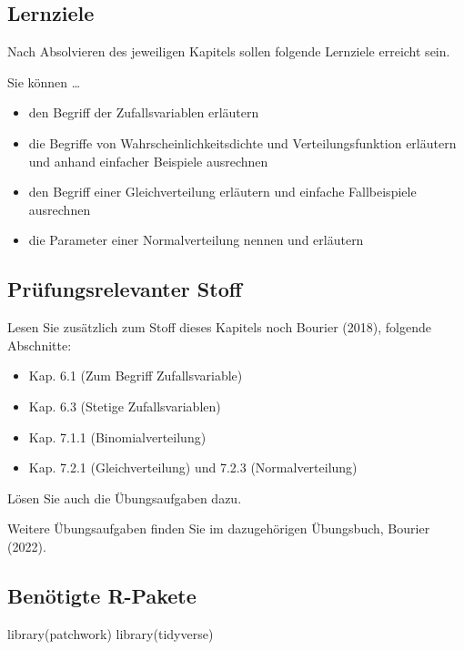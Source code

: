 \documentclass[
  a4paper,
  DIV=11]{scrreprt}
\newenvironment{Shaded}{\begin{snugshade}}{\end{snugshade}}
\newcommand{\FunctionTok}[1]{\textcolor[rgb]{0.28,0.35,0.67}{#1}}
\newcommand{\NormalTok}[1]{\textcolor[rgb]{0.00,0.23,0.31}{#1}}
\providecommand{\tightlist}{%
  \setlength{\itemsep}{0pt}\setlength{\parskip}{0pt}}\usepackage{longtable,booktabs,array}
\theoremstyle{definition}
\theoremstyle{remark}
\begin{document}
\hypertarget{lernziele-3}{%
\subsection{Lernziele}\label{lernziele-3}}

Nach Absolvieren des jeweiligen Kapitels sollen folgende Lernziele
erreicht sein.

Sie können \ldots{}

\begin{itemize}
\tightlist
\item
  den Begriff der Zufallsvariablen erläutern
\item
  die Begriffe von Wahrscheinlichkeitsdichte und Verteilungsfunktion
  erläutern und anhand einfacher Beispiele ausrechnen
\item
  den Begriff einer Gleichverteilung erläutern und einfache
  Fallbeispiele ausrechnen
\item
  die Parameter einer Normalverteilung nennen und erläutern
\end{itemize}

\hypertarget{pruxfcfungsrelevanter-stoff-1}{%
\subsection{Prüfungsrelevanter
Stoff}\label{pruxfcfungsrelevanter-stoff-1}}

Lesen Sie zusätzlich zum Stoff dieses Kapitels noch Bourier (2018),
folgende Abschnitte:

\begin{itemize}
\tightlist
\item
  Kap. 6.1 (Zum Begriff Zufallsvariable)
\item
  Kap. 6.3 (Stetige Zufallsvariablen)
\item
  Kap. 7.1.1 (Binomialverteilung)
\item
  Kap. 7.2.1 (Gleichverteilung) und 7.2.3 (Normalverteilung)
\end{itemize}

Lösen Sie auch die Übungsaufgaben dazu.

Weitere Übungsaufgaben finden Sie im dazugehörigen Übungsbuch, Bourier
(2022).

\hypertarget{benuxf6tigte-r-pakete}{%
\subsection{Benötigte R-Pakete}\label{benuxf6tigte-r-pakete}}

\begin{Shaded}
\begin{Highlighting}[]
\FunctionTok{library}\NormalTok{(patchwork)}
\FunctionTok{library}\NormalTok{(tidyverse)}
\end{Highlighting}
\end{Shaded}
\end{document}
